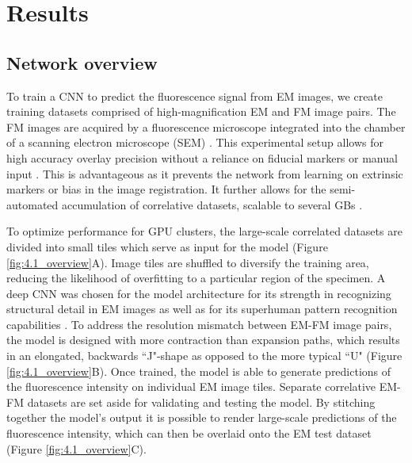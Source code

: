 \section{Results}
\label{sec:4.2_results}

\subsection{Network overview}
\label{sec:4results_overview}

To train a CNN to predict the fluorescence signal from EM images, we create training datasets comprised of high-magnification EM and FM image pairs. The FM images are acquired by a fluorescence microscope integrated into the chamber of a scanning electron microscope (SEM) \cite{liv2013simultaneous, zonnevylle2013integration}. This experimental setup allows for high accuracy overlay precision without a reliance on fiducial markers or manual input \cite{haring2017automated}. This is advantageous as it prevents the network from learning on extrinsic markers or bias in the image registration. It further allows for the semi-automated accumulation of correlative datasets, scalable to several GBs \cite{lane2021optimization}.

To optimize performance for GPU clusters, the large-scale correlated datasets are divided into small tiles which serve as input for the model (Figure \ref{fig:4.1_overview}A). Image tiles are shuffled to diversify the training area, reducing the likelihood of overfitting to a particular region of the specimen. A deep CNN was chosen for the model architecture for its strength in recognizing structural detail in EM images as well as for its superhuman pattern recognition capabilities \needref. To address the resolution mismatch between EM-FM image pairs, the model is designed with more contraction than expansion paths, which results in an elongated, backwards ``J"-shape as opposed to the more typical ``U" (Figure \ref{fig:4.1_overview}B). Once trained, the model is able to generate predictions of the fluorescence intensity on individual EM image tiles. Separate correlative EM-FM datasets are set aside for validating and testing the model. By stitching together the model's output it is possible to render large-scale predictions of the fluorescence intensity, which can then be overlaid onto the EM test dataset (Figure \ref{fig:4.1_overview}C).

